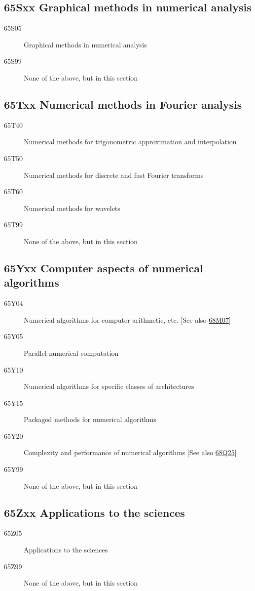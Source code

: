 \subsection*{65Sxx  Graphical methods in numerical analysis }\label{65Sxx}
\begin{description}  
\item [65S05]\label{65S05} Graphical methods in numerical analysis
\item [65S99]\label{65S99} None of the above, but in this section
\end{description}
\subsection*{65Txx  Numerical methods in Fourier analysis }\label{65Txx}
\begin{description}  
\item [65T40]\label{65T40} Numerical methods for trigonometric approximation and interpolation
\item [65T50]\label{65T50} Numerical methods for discrete and fast Fourier transforms
\item [65T60]\label{65T60} Numerical methods for wavelets
\item [65T99]\label{65T99} None of the above, but in this section
\end{description}
\subsection*{65Yxx  Computer aspects of numerical algorithms }\label{65Yxx}
\begin{description}  
\item [65Y04]\label{65Y04} Numerical algorithms for computer arithmetic, etc. [See also \hyperref[68M07]{68M07}]
\item [65Y05]\label{65Y05} Parallel numerical computation
\item [65Y10]\label{65Y10} Numerical algorithms for specific classes of architectures
\item [65Y15]\label{65Y15} Packaged methods for numerical algorithms
\item [65Y20]\label{65Y20} Complexity and performance of numerical algorithms [See also \hyperref[68Q25]{68Q25}]
\item [65Y99]\label{65Y99} None of the above, but in this section
\end{description}
\subsection*{65Zxx   Applications to the sciences }\label{65Zxx}
\begin{description}  
\item [65Z05]\label{65Z05}  Applications to the sciences
\item [65Z99]\label{65Z99} None of the above, but in this section
\end{description}
